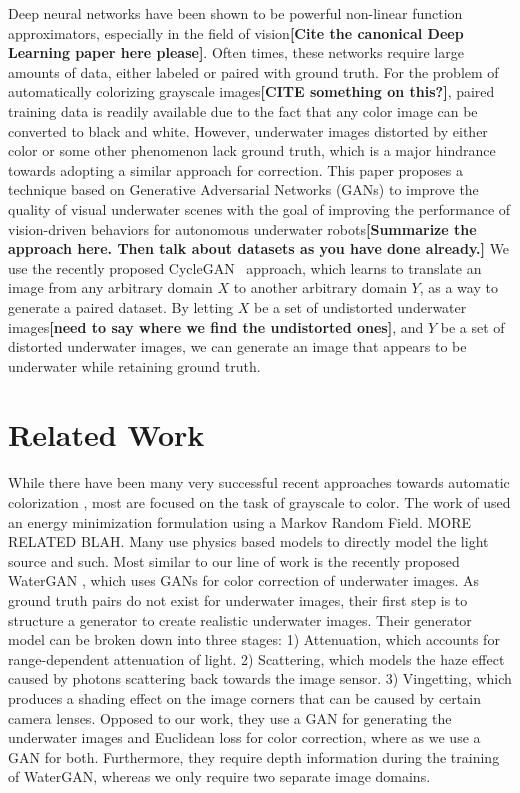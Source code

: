 \documentclass[letterpaper, 10pt, conference]{ieeeconf}
\newcommand{\marginlabel}[1]{\mbox{}\marginpar[\raggedleft\hspace{0pt}{#1}]{
\raggedright\hspace{0pt}{#1}}}
\newcommand{\starnote}[1]{\marginlabel{$\bigstar$}\textbf{[#1]}}
\begin{document}
Deep neural networks have been shown to be powerful non-linear function approximators, especially in the field of vision\starnote{Cite the
  canonical Deep Learning paper here please}. Often times, these networks require large amounts of data, either labeled or paired with
ground truth. For the problem of automatically colorizing grayscale images\starnote{CITE something on this?}, paired training data is
readily available due to the fact that any color image can be converted to black and white. However, underwater images distorted by either
color or some other phenomenon lack ground truth, which is a major hindrance towards adopting a similar approach for correction. This paper proposes a technique based on Generative Adversarial Networks (GANs) to improve the quality of visual underwater scenes with the goal of improving the performance of vision-driven behaviors for autonomous underwater robots\starnote{Summarize the approach here. Then talk about datasets as you have done already.} We use the recently proposed CycleGAN~\cite{zhu2017unpaired} approach, which learns to translate an image from any arbitrary domain $X$ to another arbitrary domain $Y$, as a way to generate a paired dataset. By letting $X$ be a set of undistorted underwater images\starnote{need to say where we find the undistorted ones}, and $Y$ be a set of distorted underwater images, we can generate an image that appears to be underwater while retaining ground truth.

\section{Related Work}

While there have been many very successful recent approaches towards automatic colorization
\cite{zhang2016colorful,iizuka2016let}, most are focused on the task of grayscale to color.
The work of \cite{torres2005color} used an energy minimization formulation using a Markov Random Field. 
MORE RELATED BLAH. Many use physics based models to directly model the light source and such.
Most similar to our line of work is the recently proposed WaterGAN \cite{li2017watergan}, which uses
GANs for color correction of underwater images. As ground truth pairs do not exist for underwater images,
their first step is to structure a generator to create realistic underwater images. Their generator model
can be broken down into three stages: 1) Attenuation, which accounts for range-dependent attenuation of light.
2) Scattering, which models the haze effect caused by photons scattering back towards the image sensor. 3)
Vingetting, which produces a shading effect on the image corners that can be caused by certain camera lenses.
Opposed to our work, they use a GAN for generating the underwater images and Euclidean loss for color correction,
where as we use a GAN for both. Furthermore, they require depth information during the training of WaterGAN,
whereas we only require two separate image domains.
\end{document}
